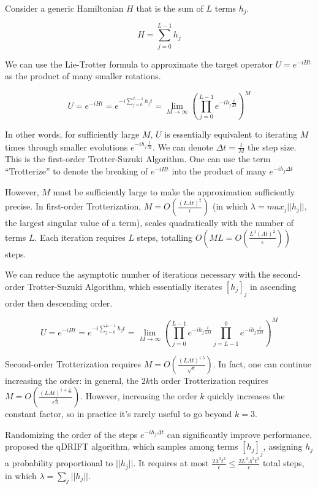 Consider a generic Hamiltonian $H$ that is the sum of $L$ terms $h_j$.

\begin{equation}
    H = \sum_{j = 0}^{L - 1} h_j
\end{equation}

We can use the Lie-Trotter formula to approximate the target operator $U = e^{-iHt}$ as the product of many smaller rotations.

\begin{equation}
    U = e^{-iHt} = e^{-i\sum_{j = 0}^{L - 1} h_jt} = \lim_{M \rightarrow \infty} (\prod_{j = 0}^{L - 1} e^{-ih_j\frac{t}{M}})^M
\end{equation}

In other words, for sufficiently large $M$, $U$ is essentially equivalent to iterating $M$ times through smaller evolutions $e^{-ih_j\frac{t}{M}}$. We can denote $\Delta t = \frac{t}{M}$ the step size. This is the first-order Trotter-Suzuki Algorithm. One can use the term ``Trotterize'' to denote the breaking of $e^{-iHt}$ into the product of many $e^{-ih_j\Delta t}$

However, $M$ must be sufficiently large to make the approximation sufficiently precise. In first-order Trotterization, $M = O(\frac{(L\Lambda t)^2}{\epsilon})$ (in which $\lambda = max_j ||h_j||$, the largest singular value of a term), scales quadratically with the number of terms $L$. Each iteration requires $L$ steps, totalling $O(ML = O(\frac{L^3(\Lambda t)^2}{\epsilon}))$ steps.

We can reduce the asymptotic number of iterations necessary with the second-order Trotter-Suzuki Algorithm, which essentially iterates $[h_j]_j$ in ascending order then descending order.

\begin{equation}
    U = e^{-iHt} = e^{-i\sum_{j = 0}^{L - 1} h_jt} = \lim_{M \rightarrow \infty} (\prod_{j = 0}^{L - 1} e^{-ih_j\frac{t}{2M}}\prod_{j = L - 1}^{0} e^{-ih_j\frac{t}{2M}})^M
\end{equation}

Second-order Trotterization requires $M = O(\frac{(L\Lambda t)^{1.5}}{\sqrt{\epsilon}})$. In fact, one can continue increasing the order: in general, the $2k$th order Trotterization requires $M = O(\frac{(L\Lambda t)^{1+\frac{1}{2k}}}{\epsilon^{\frac{1}{2k}}})$. However, increasing the order $k$ quickly increases the constant factor, so in practice it's rarely useful to go beyond $k = 3$.

Randomizing the order of the steps $e^{-ih_j\Delta t}$ can significantly improve performance. \cite{QDRIFT} proposed the qDRIFT algorithm, which samples among terms $[h_j]_j$, assigning $h_j$ a probability proportional to $||h_j||$. It requires at most $\frac{2\lambda^2 t^2}{\epsilon} \leq \frac{2L^2\Lambda^2 t^2}{\epsilon}$ total steps, in which $\lambda = \sum_j ||h_j||$.

